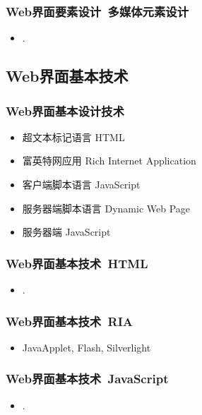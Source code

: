 \documentclass{beamer}
\begin{document}
\begin{frame}
	\frametitle{Web界面要素设计~{\small 多媒体元素设计}}
	\beamertemplatetransparentcovereddynamicmedium
	\begin{itemize}[<+->]
		\item .
	\end{itemize}
\end{frame}

\subsection{Web界面基本技术}
\begin{frame}
	\frametitle{Web界面基本设计技术}
	\beamertemplatetransparentcovereddynamicmedium
	\begin{itemize}[<+->]
		\item 超文本标记语言 HTML
		\item 富英特网应用 Rich Internet Application 
		\item 客户端脚本语言 JavaScript 
		\item 服务器端脚本语言 Dynamic Web Page
		\item 服务器端 JavaScript
	\end{itemize}
\end{frame}

\begin{frame}
	\frametitle{Web界面基本技术~{\small HTML}}
	\beamertemplatetransparentcovereddynamicmedium
	\begin{itemize}[<+->]
		\item .
	\end{itemize}
\end{frame}

\begin{frame}
	\frametitle{Web界面基本技术~{\small RIA}}
	\beamertemplatetransparentcovereddynamicmedium
	\begin{itemize}[<+->]
		\item JavaApplet, Flash, Silverlight
	\end{itemize}
\end{frame}

\begin{frame}
	\frametitle{Web界面基本技术~{\small JavaScript}}
	\beamertemplatetransparentcovereddynamicmedium
	\begin{itemize}[<+->]
		\item .
	\end{itemize}
\end{frame}
\end{document}
